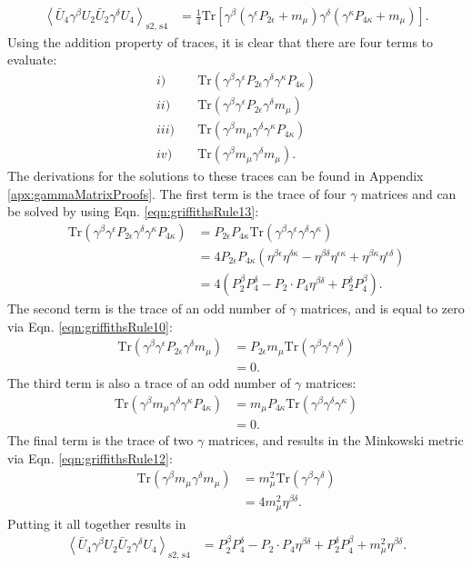 \begin{align*}
\left< \bar{U}_4 \gamma^\beta U_2 \bar{U}_2 \gamma^\delta U_4 \right> _\text{s2, s4}
&=\frac{1}{4}\text{Tr}[\gamma^\beta(\gamma^\epsilon P_{2\epsilon}+m_\mu)\gamma^\delta (\gamma^\kappa P_{4\kappa}+m_\mu)].
\end{align*}
Using the addition property of traces, it is clear that there are four terms to evaluate:
\begin{align*}
i) &\quad \text{Tr}(\gamma^\beta \gamma^\epsilon P_{2\epsilon}\gamma^\delta\gamma^\kappa P_{4\kappa})\\
ii) &\quad \text{Tr}(\gamma^\beta \gamma^\epsilon P_{2\epsilon}\gamma^\delta m_\mu)\\
iii) &\quad \text{Tr}(\gamma^\beta m_\mu \gamma^\delta\gamma^\kappa P_{4\kappa})\\
iv) &\quad \text{Tr}(\gamma^\beta m_\mu \gamma^\delta m_\mu).
\end{align*}
The derivations for the solutions to these traces can be found in Appendix \ref{apx:gammaMatrixProofs}. The first term is the trace of four $\gamma$ matrices and can be solved by using Eqn. \ref{eqn:griffithsRule13}:
\begin{align*}
\text{Tr}(\gamma^\beta \gamma^\epsilon P_{2\epsilon}\gamma^\delta\gamma^\kappa P_{4\kappa})
&= P_{2\epsilon}P_{4\kappa}\text{Tr}(\gamma^\beta \gamma^\epsilon\gamma^\delta\gamma^\kappa)\\
&=4P_{2\epsilon} P_{4\kappa} (\eta^{\beta\epsilon}\eta^{\delta\kappa}-\eta^{\beta\delta}\eta^{\epsilon\kappa}+\eta^{\beta\kappa}\eta^{\epsilon\delta})\\
&=4(P_2 ^\beta P_4 ^\delta - P_2 \cdot P_4 \eta^{\beta\delta} + P_2 ^\delta P_4 ^\beta).
\end{align*}
The second term is the trace of an odd number of $\gamma$ matrices, and is equal to zero via Eqn. \ref{eqn:griffithsRule10}:
\begin{align*}
\text{Tr}(\gamma^\beta \gamma^\epsilon P_{2\epsilon}\gamma^\delta m_\mu)
&= P_{2\epsilon}m_\mu\text{Tr}(\gamma^\beta \gamma^\epsilon\gamma^\delta)\\
&=0.
\end{align*}
The third term is also a trace of an odd number of $\gamma$ matrices:
\begin{align*}
\text{Tr}(\gamma^\beta m_\mu \gamma^\delta\gamma^\kappa P_{4\kappa})
&=m_\mu P_{4\kappa} \text{Tr}(\gamma^\beta  \gamma^\delta\gamma^\kappa)\\
&=0.
\end{align*}
The final term is the trace of two $\gamma$ matrices, and results in the Minkowski metric via Eqn. \ref{eqn:griffithsRule12}:
\begin{align*}
\text{Tr}(\gamma^\beta m_\mu \gamma^\delta m_\mu)
&=m_\mu ^2 \text{Tr}(\gamma^\beta \gamma^\delta)\\
&=4 m_\mu ^2 \eta^{\beta\delta}.
\end{align*}
Putting it all together results in
\begin{align*}
\left< \bar{U}_4 \gamma^\beta U_2 \bar{U}_2 \gamma^\delta U_4 \right> _\text{s2, s4}
&=P_2^\beta P_4^\delta - P_2 \cdot P_4 \eta^{\beta\delta}+P_2 ^\delta P_4 ^\beta + m_\mu ^2 \eta^{\beta\delta}.
\end{align*}

